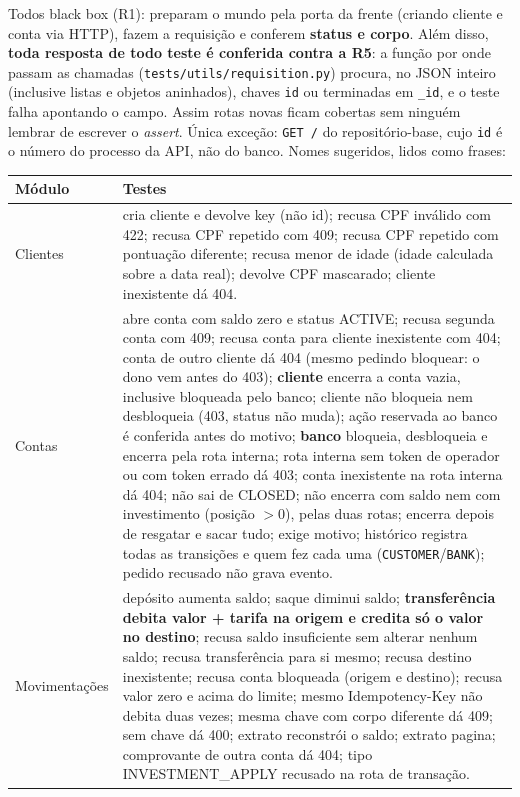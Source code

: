 \documentclass[11pt,a4paper]{article}
\newcommand{\tb}[1]{\texttt{#1}}           %
\begin{document}
Todos black box (R1): preparam o mundo pela porta da frente (criando cliente e conta via HTTP),
fazem a requisição e conferem \textbf{status e corpo}. Além disso, \textbf{toda resposta de todo
teste é conferida contra a R5}: a função por onde passam as chamadas (\tb{tests/utils/requisition.py})
procura, no JSON inteiro (inclusive listas e objetos aninhados), chaves \tb{id} ou terminadas em
\tb{_id}, e o teste falha apontando o campo. Assim rotas novas ficam cobertas sem ninguém lembrar de
escrever o \emph{assert}. Única exceção: \tb{GET /} do repositório-base, cujo \tb{id} é o número do
processo da API, não do banco. Nomes sugeridos, lidos como frases:

\begingroup\small
\begin{longtable}{@{}P{2.4cm}P{13.7cm}@{}}
\toprule
\textbf{Módulo} & \textbf{Testes} \\
\midrule
\endhead
Clientes & cria cliente e devolve key (não id); recusa CPF inválido com 422; recusa CPF repetido com 409; recusa CPF repetido com pontuação diferente; recusa menor de idade (idade calculada sobre a data real); devolve CPF mascarado; cliente inexistente dá 404. \\
Contas & abre conta com saldo zero e status ACTIVE; recusa segunda conta com 409; recusa conta para cliente inexistente com 404; conta de outro cliente dá 404 (mesmo pedindo bloquear: o dono vem antes do 403); \textbf{cliente} encerra a conta vazia, inclusive bloqueada pelo banco; cliente não bloqueia nem desbloqueia (403, status não muda); ação reservada ao banco é conferida antes do motivo; \textbf{banco} bloqueia, desbloqueia e encerra pela rota interna; rota interna sem token de operador ou com token errado dá 403; conta inexistente na rota interna dá 404; não sai de CLOSED; não encerra com saldo nem com investimento (posição $> 0$), pelas duas rotas; encerra depois de resgatar e sacar tudo; exige motivo; histórico registra todas as transições e quem fez cada uma (\tb{CUSTOMER}/\tb{BANK}); pedido recusado não grava evento. \\
Movimentações & depósito aumenta saldo; saque diminui saldo; \textbf{transferência debita valor + tarifa na origem e credita só o valor no destino}; recusa saldo insuficiente sem alterar nenhum saldo; recusa transferência para si mesmo; recusa destino inexistente; recusa conta bloqueada (origem e destino); recusa valor zero e acima do limite; mesmo Idempotency-Key não debita duas vezes; mesma chave com corpo diferente dá 409; sem chave dá 400; extrato reconstrói o saldo; extrato pagina; comprovante de outra conta dá 404; tipo INVESTMENT_APPLY recusado na rota de transação. \\

\end{longtable}
\end{document}
